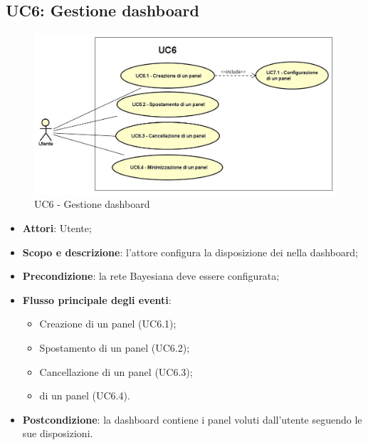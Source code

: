 \subsection{UC6: Gestione dashboard}
\hypertarget{UC6}{}
\begin{figure} [H]
	\centering
	\includegraphics[scale=0.45]{Img/UC6}
	\caption{UC6 - Gestione dashboard}\label{}
\end{figure}
\begin{itemize}
	\item \textbf{Attori}: Utente;
	\item \textbf{Scopo e descrizione}: l'attore configura la disposizione dei  nella dashboard;
	\item \textbf{Precondizione}: la rete Bayesiana deve essere configurata;
	\item \textbf{Flusso principale degli eventi}:
	\begin{itemize}
		\item Creazione di un panel  (UC6.1);
		\item Spostamento di un panel  (UC6.2);
		\item Cancellazione di un panel  (UC6.3);
		\item {} di un panel  (UC6.4).
	\end{itemize}
	\item \textbf{Postcondizione}: la dashboard contiene i panel voluti dall'utente seguendo le sue disposizioni.
\end{itemize}
